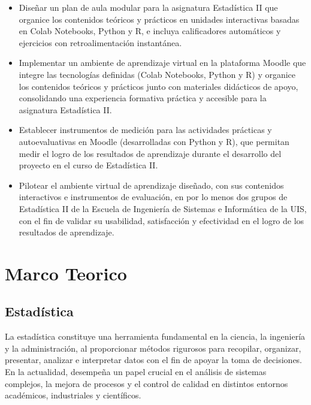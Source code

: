 \documentclass[letter,oneside,12pt,spanish]{report}
\begin{document}
\begin{itemize}
    \item Diseñar un plan de aula modular para la asignatura Estadística II que organice los contenidos teóricos y prácticos en 
    unidades interactivas basadas en Colab Notebooks, Python y R, e incluya calificadores automáticos y ejercicios con retroalimentación 
    instantánea.
    
    \item Implementar un ambiente de aprendizaje virtual en la plataforma Moodle que integre las tecnologías definidas (Colab Notebooks, 
    Python y R) y organice los contenidos teóricos y prácticos junto con materiales didácticos de apoyo, consolidando una experiencia 
    formativa práctica y accesible para la asignatura Estadística II.
    
    \item Establecer instrumentos de medición para las actividades prácticas y autoevaluativas en Moodle (desarrolladas con Python y R), 
    que permitan medir el logro de los resultados de aprendizaje durante el desarrollo del proyecto en el curso de Estadística II.

    \item Pilotear el ambiente virtual de aprendizaje diseñado, con sus contenidos interactivos e instrumentos de evaluación, en por lo 
    menos dos grupos de Estadística II de la Escuela de Ingeniería de Sistemas e Informática de la UIS, con el fin de validar su 
    usabilidad, satisfacción y efectividad en el logro de los resultados de aprendizaje.

\end{itemize}


\newpage

\chapter{Marco Teorico}

\section{Estadística}

La estadística constituye una herramienta fundamental en la ciencia, la ingeniería y la administración, al proporcionar métodos rigurosos para recopilar, organizar, presentar, analizar e interpretar datos con el fin de apoyar la toma de decisiones. En la actualidad, desempeña un papel crucial en el análisis de sistemas complejos, la mejora de procesos y el control de calidad en distintos entornos académicos, industriales y científicos.
\end{document}
